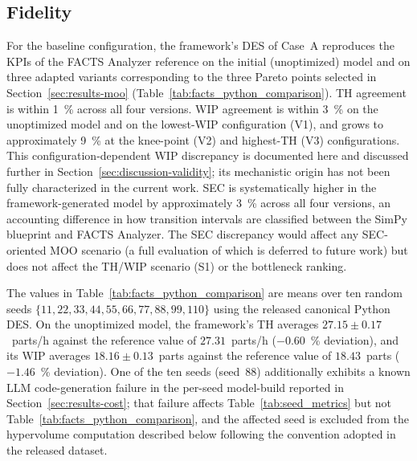 \documentclass[a4paper,fleqn]{cas-sc}
\begin{document}
  

  \subsection{Fidelity}\label{sec:results-fidelity}   

For the baseline configuration, the framework's DES of Case~A reproduces the KPIs of the FACTS Analyzer reference on the initial (unoptimized) model and on three adapted variants corresponding to the three Pareto points selected in Section~\ref{sec:results-moo} (Table~\ref{tab:facts_python_comparison}). TH agreement is within 1~\% across all four versions. WIP agreement is within 3~\% on the unoptimized model and on the lowest-WIP configuration (V1), and grows to approximately 9~\% at the knee-point (V2) and highest-TH (V3) configurations. This configuration-dependent WIP discrepancy is documented here and discussed further in Section~\ref{sec:discussion-validity}; its mechanistic origin has not been fully characterized in the current work.
SEC is systematically higher in the framework-generated model by approximately 3~\% across all four versions, an accounting difference in how transition intervals are classified between the SimPy blueprint and FACTS Analyzer. The SEC discrepancy would affect any SEC-oriented MOO scenario (a full evaluation of which is deferred to future work) but does not   
  affect the TH/WIP scenario (S1) or the bottleneck ranking.

The values in Table~\ref{tab:facts_python_comparison} are means over ten random seeds $\{11, 22, 33, 44, 55, 66, 77, 88, 99, 110\}$ using the
released canonical Python DES. On the unoptimized model, the framework's TH averages $27.15 \pm 0.17$~parts/h against the reference value of $27.31$~parts/h ($-0.60$~\% deviation), and its WIP averages $18.16 \pm 0.13$~parts against the reference value of $18.43$~parts ($-1.46$~\% deviation). One of the ten seeds (seed~88) additionally exhibits a known LLM code-generation failure in the per-seed model-build reported in Section~\ref{sec:results-cost}; that failure affects  Table~\ref{tab:seed_metrics} but not Table~\ref{tab:facts_python_comparison}, and the affected seed is excluded from the hypervolume computation described below following the convention adopted in the released dataset.
\end{document}
